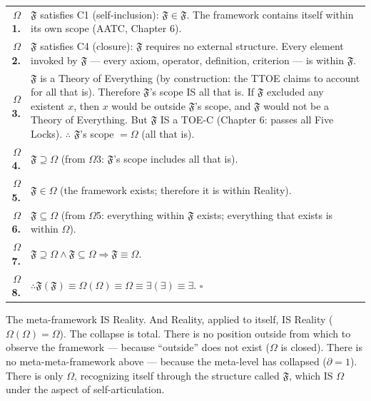 \documentclass[10pt, openany, oneside]{book}
\renewcommand{\footnotesize}{\fontsize{8.5}{11}\selectfont}
\begin{document}
{\footnotesize
\noindent\begin{tabular}{r p{}}
\textbf{$\Omega$1.} & $\mathfrak{F}$ satisfies C1 (self-inclusion): $\mathfrak{F} \in \mathfrak{F}$. The framework contains itself within its own scope (AATC, Chapter 6). \\[0.3em]
\textbf{$\Omega$2.} & $\mathfrak{F}$ satisfies C4 (closure): $\mathfrak{F}$ requires no external structure. Every element invoked by $\mathfrak{F}$ --- every axiom, operator, definition, criterion --- is within $\mathfrak{F}$. \\[0.3em]
\textbf{$\Omega$3.} & $\mathfrak{F}$ is a Theory of Everything (by construction: the TTOE claims to account for all that is). Therefore $\mathfrak{F}$'s scope IS all that is. If $\mathfrak{F}$ excluded any existent $x$, then $x$ would be outside $\mathfrak{F}$'s scope, and $\mathfrak{F}$ would not be a Theory of Everything. But $\mathfrak{F}$ IS a TOE-C (Chapter 6: passes all Five Locks). $\therefore$ $\mathfrak{F}$'s scope $= \Omega$ (all that is). \\[0.3em]
\textbf{$\Omega$4.} & $\mathfrak{F} \supseteq \Omega$ (from $\Omega$3: $\mathfrak{F}$'s scope includes all that is). \\[0.3em]
\textbf{$\Omega$5.} & $\mathfrak{F} \in \Omega$ (the framework exists; therefore it is within Reality). \\[0.3em]
\textbf{$\Omega$6.} & $\mathfrak{F} \subseteq \Omega$ (from $\Omega$5: everything within $\mathfrak{F}$ exists; everything that exists is within $\Omega$). \\[0.3em]
\textbf{$\Omega$7.} & $\mathfrak{F} \supseteq \Omega \wedge \mathfrak{F} \subseteq \Omega \Rightarrow \mathfrak{F} \equiv \Omega$. \\[0.3em]
\textbf{$\Omega$8.} & $\therefore \mathfrak{F}(\mathfrak{F}) \equiv \Omega(\Omega) \equiv \Omega \equiv \exists(\exists) \equiv \exists$. $\square$ \\[0.3em]
\end{tabular}
}

\vspace{0.8em}

\noindent The meta-framework IS Reality. And Reality, applied to itself, IS Reality ($\Omega(\Omega) = \Omega$). The collapse is total. There is no position outside from which to observe the framework --- because ``outside'' does not exist ($\Omega$ is closed). There is no meta-meta-framework above --- because the meta-level has collapsed ($\partial = 1$). There is only $\Omega$, recognizing itself through the structure called $\mathfrak{F}$, which IS $\Omega$ under the aspect of self-articulation.
\end{document}
